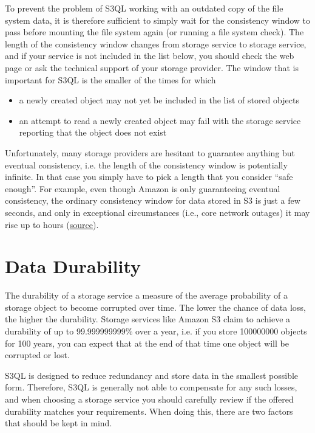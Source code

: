 \documentclass[letterpaper,10pt,english]{sphinxmanual}
\begin{document}
To prevent the problem of S3QL working with an outdated copy of the
file system data, it is therefore sufficient to simply wait for the
consistency window to pass before mounting the file system again (or
running a file system check). The length of the consistency window
changes from storage service to storage service, and if your service
is not included in the list below, you should check the web page or
ask the technical support of your storage provider. The window that is
important for S3QL is the smaller of the times for which
\begin{itemize}
\item {} 
a newly created object may not yet be included in the list of
stored objects

\item {} 
an attempt to read a newly created object may fail with the
storage service reporting that the object does not exist

\end{itemize}

Unfortunately, many storage providers are hesitant to guarantee
anything but eventual consistency, i.e. the length of the consistency
window is potentially infinite. In that case you simply have to pick a
length that you consider ``safe enough''. For example, even though
Amazon is only guaranteeing eventual consistency, the ordinary
consistency window for data stored in S3 is just a few seconds, and
only in exceptional circumstances (i.e., core network outages) it may
rise up to hours (\href{http://forums.aws.amazon.com/message.jspa?messageID=38471\#38471}{source}).


\section{Data Durability}
\label{durability:backend-reliability}\label{durability:data-durability}
The durability of a storage service a measure of the average
probability of a storage object to become corrupted over time. The
lower the chance of data loss, the higher the durability. Storage
services like Amazon S3 claim to achieve a durability of up to
99.999999999\% over a year, i.e. if you store 100000000 objects for 100
years, you can expect that at the end of that time one object will be
corrupted or lost.

S3QL is designed to reduce redundancy and store data in the smallest
possible form. Therefore, S3QL is generally not able to compensate for
any such losses, and when choosing a storage service you should
carefully review if the offered durability matches your requirements.
When doing this, there are two factors that should be kept in mind.
\end{document}
